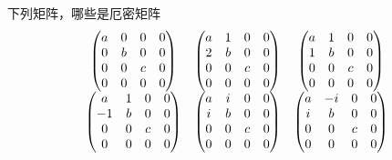 \begin{frame} 
    \frametitle{} 
    下列矩阵，哪些是厄密矩阵\\
    $$\begin{matrix}
        \begin{pmatrix}
            a & 0 & 0 & 0 \\
            0 & b & 0 & 0 \\
            0 & 0 & c & 0\\
            0 & 0 & 0 & 0 \\
         \end{pmatrix} 
         &  
         \begin{pmatrix}
            a & 1 & 0 & 0 \\
            2 & b & 0 & 0 \\
            0 & 0 & c & 0\\
            0 & 0 & 0 & 0 \\
         \end{pmatrix} 
         & 
         \begin{pmatrix}
            a & 1 & 0 & 0 \\
            1 & b & 0 & 0 \\
            0 & 0 & c & 0 \\
            0 & 0 & 0 & 0 \\
         \end{pmatrix} 
         \\ \vspace{0.6em}
         \begin{pmatrix}
            a & 1 & 0 & 0 \\
            -1 & b & 0 & 0 \\
            0 & 0 & c & 0 \\
            0 & 0 & 0 & 0 \\
         \end{pmatrix} 
         &     
        \begin{pmatrix}
            a & i & 0 & 0 \\
            i & b & 0 & 0 \\
            0 & 0 & c & 0 \\
            0 & 0 & 0 & 0 \\
        \end{pmatrix} 
         &   
         \begin{pmatrix}
            a & -i & 0 & 0 \\
            i & b & 0 & 0 \\
            0 & 0 & c & 0 \\
            0 & 0 & 0 & 0 \\
         \end{pmatrix} 
    \end{matrix}
        $$
\end{frame}


